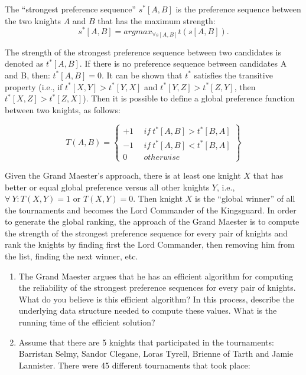 \documentclass[11pt]{article}
\begin{document}
\noindent The ``strongest preference sequence'' $s^*[A,B]$ is the
preference sequence between the two knights $A$ and $B$ that has the
maximum strength:
$$s^*[A,B] = argmax_{\forall s[A,B]} t( s[A,B] ).$$ 

\noindent The strength of the strongest preference sequence between
two candidates is denoted as $t^*[A,B]$. If there is no preference
sequence between candidates A and B, then: $t^*[A,B] = 0$. It can be
shown that $t^*$ satisfies the transitive property (i.e., if $t^*[X,Y]
> t^*[Y,X]$ and $t^*[Y,Z] > t^*[Z,Y]$, then $t^*[X,Z] >
t^*[Z,X]$). Then it is possible to define a global preference function
between two knights, as follows:\vspace{-.2in}

\begin{equation*}
T(A,B)=\left\{
\begin{matrix}+1\ &\ if\ t^*[A,B]>t^*[B,A]\\
-1\ &\ if\ t^*[A,B]<t^*[B,A]\\
0\ &\ otherwise
\end{matrix}
\right\}
\end{equation*}

\noindent Given the Grand Maester's approach, there is at least one
knight $X$ that has better or equal global preference versus all other
knights $Y$, i.e., $\forall\ Y: T(X,Y) = 1$ or $T(X,Y)=0$. Then knight
$X$ is the ``global winner'' of all the tournaments and becomes the
Lord Commander of the Kingsguard.  In order to generate the global
ranking, the approach of the Grand Maester is to compute the strength
of the strongest preference sequence for every pair of knights and
rank the knights by finding first the Lord Commander, then removing
him from the list, finding the next winner, etc.\\

\begin{enumerate}[label=\Alph*.]
\item The Grand Maester argues that he has an
efficient algorithm for computing the reliability of the strongest
preference sequences for every pair of knights. What do you believe is
this efficient algorithm? In this process, describe the underlying
data structure needed to compute these values. What is the running
time of the efficient solution?\\

\item Assume that there are 5 knights that
participated in the tournaments: Barristan Selmy, Sandor Clegane,
Loras Tyrell, Brienne of Tarth and Jamie Lannister. There were 45
different tournaments that took place:\\
\end{enumerate}
\end{document}
